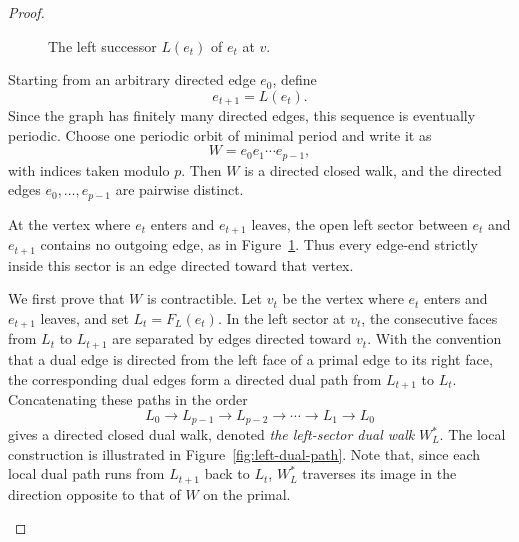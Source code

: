 \documentclass[11pt]{amsart}
\theoremstyle{plain}
\theoremstyle{definition}
\theoremstyle{remark}
\begin{document}
\begin{proof}
\begin{figure}[ht]
\caption{The left successor $L(e_t)$ of $e_t$ at $v$.}
\label{fig:left-successor}
\end{figure}

Starting from an arbitrary directed edge $e_0$, define
\[
  e_{t+1} = L(e_t).
\]
Since the graph has finitely many directed edges, this sequence is eventually periodic. Choose one periodic orbit of minimal period and write it as
\[
  W = e_0 e_1 \cdots e_{p-1},
\]
with indices taken modulo $p$. Then $W$ is a directed closed walk, and the directed edges $e_0, \dots, e_{p-1}$ are pairwise distinct.

At the vertex where $e_t$ enters and $e_{t+1}$ leaves, the open left sector between $e_t$ and $e_{t+1}$ contains no outgoing edge, as in Figure~\ref{fig:left-successor}. Thus every edge-end strictly inside this sector is an edge directed toward that vertex.

We first prove that $W$ is contractible. Let $v_t$ be the vertex where $e_t$ enters and $e_{t+1}$ leaves, and set $L_t = F_L(e_t)$. In the left sector at $v_t$, the consecutive faces from $L_t$ to $L_{t+1}$ are separated by edges directed toward $v_t$. With the convention that a dual edge is directed from the left face of a primal edge to its right face, the corresponding dual edges form a directed dual path from $L_{t+1}$ to $L_t$. Concatenating these paths in the order
\[
  L_0 \to L_{p-1} \to L_{p-2} \to \cdots \to L_1 \to L_0
\]
gives a directed closed dual walk, denoted \emph{the left-sector dual walk} $W_L^*$. The local construction is illustrated in Figure~\ref{fig:left-dual-path}. Note that, since each local dual path runs from $L_{t+1}$ back to $L_t$, $W_L^*$ traverses its image in the direction opposite to that of $W$ on the primal.

\begin{figure}[ht]
\centering
{}
\end{figure}
\end{proof}
\end{document}
